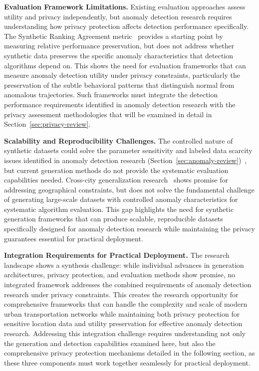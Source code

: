 \documentclass[runningheads]{llncs}
\begin{document}
\textbf{Evaluation Framework Limitations.} Existing evaluation approaches assess utility and privacy independently, but anomaly detection research requires understanding how privacy protection affects detection performance specifically. The Synthetic Ranking Agreement metric~\cite{jordon2019pate} provides a starting point by measuring relative performance preservation, but does not address whether synthetic data preserves the specific anomaly characteristics that detection algorithms depend on. This shows the need for evaluation frameworks that can measure anomaly detection utility under privacy constraints, particularly the preservation of the subtle behavioral patterns that distinguish normal from anomalous trajectories. Such frameworks must integrate the detection performance requirements identified in anomaly detection research with the privacy assessment methodologies that will be examined in detail in Section~\ref{sec:privacy-review}.

\textbf{Scalability and Reproducibility Challenges.} The controlled nature of synthetic datasets could solve the parameter sensitivity and labeled data scarcity issues identified in anomaly detection research (Section~\ref{sec:anomaly-review})~\cite{zhang2019ibat}, but current generation methods do not provide the systematic evaluation capabilities needed. Cross-city generalization research~\cite{wang2025gtg} shows promise for addressing geographical constraints, but does not solve the fundamental challenge of generating large-scale datasets with controlled anomaly characteristics for systematic algorithm evaluation. This gap highlights the need for synthetic generation frameworks that can produce scalable, reproducible datasets specifically designed for anomaly detection research while maintaining the privacy guarantees essential for practical deployment.

\textbf{Integration Requirements for Practical Deployment.} The research landscape shows a synthesis challenge: while individual advances in generation architectures, privacy protection, and evaluation methods show promise, no integrated framework addresses the combined requirements of anomaly detection research under privacy constraints. This creates the research opportunity for comprehensive frameworks that can handle the complexity and scale of modern urban transportation networks while maintaining both privacy protection for sensitive location data and utility preservation for effective anomaly detection research. Addressing this integration challenge requires understanding not only the generation and detection capabilities examined here, but also the comprehensive privacy protection mechanisms detailed in the following section, as these three components must work together seamlessly for practical deployment.
\end{document}
